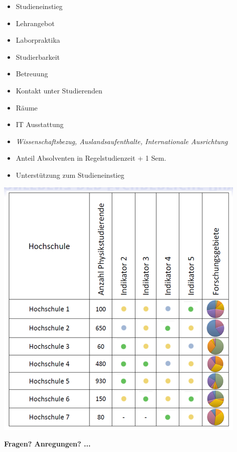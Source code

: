 \documentclass[
	paper=128mm:96mm,%
	fontsize=11pt,%
	pagesize ,%
	parskip=half -,%
	numbers=noendperiod ,%
	captions=nooneline%
	,bibliography=totoc,listof=totoc, index=totoc,DIV=calc
]{scrartcl}
\begin{document}
\begin{multicols}{2}
		\begin{itemize}[label=\color{mydotcolor2}$\pmb\rightarrow$]
			\item Studieneinstieg
			\item Lehrangebot
			\item Laborpraktika
			\item Studierbarkeit
			\item Betreuung
			\item Kontakt unter Studierenden
			\item Räume
			\item IT Ausstattung
			\item \emph{Wissenschaftsbezug, Auslandsaufenthalte, Internationale Ausrichtung}
			\item Anteil Absolventen in Regelstudienzeit + 1 Sem.
			\item Unterstützung zum Studieneinstieg
		\end{itemize}
\end{multicols}
\pagebreak
{}
\begin{center}
	\includegraphics[height=0.85\textheight]{KFP_CHE_Forschungsprofil.PNG}
\end{center}

\pagebreak
\thispagestyle{empty}
{\color{myfontcolor1}
	\begin{center}
		{\Huge \textbf{Fragen? Anregungen? ...}}\\
	\end{center}
}
\end{document}
